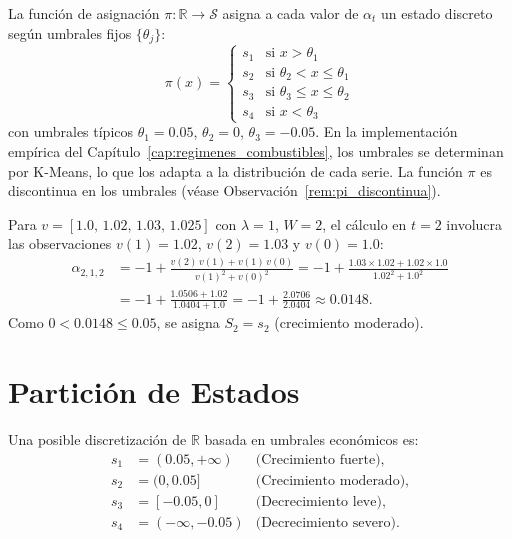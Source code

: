 \begin{definition}
\label{def:pi_cuantizacion}
La función de asignación $\pi\colon \mathbb{R} \to \mathcal{S}$
asigna a cada valor de $\alpha_t$ un estado discreto según
umbrales fijos $\{\theta_j\}$:
\[
\pi(x) = \begin{cases}
  s_1 & \text{si } x > \theta_1 \\
  s_2 & \text{si } \theta_2 < x \leq \theta_1 \\
  s_3 & \text{si } \theta_3 \leq x \leq \theta_2 \\
  s_4 & \text{si } x < \theta_3
\end{cases}
\]
con umbrales típicos $\theta_1 = 0.05$, $\theta_2 = 0$,
$\theta_3 = -0.05$.  En la implementación empírica del
Capítulo~\ref{cap:regimenes_combustibles}, los umbrales se
determinan por K-Means, lo que los adapta a la distribución de
cada serie.  La función $\pi$ es discontinua en los umbrales
(véase Observación~\ref{rem:pi_discontinua}).
\end{definition}

\begin{examplex}
Para $v = [1.0,\, 1.02,\, 1.03,\, 1.025]$ con $\lambda = 1$,
$W = 2$, el cálculo en $t = 2$ involucra las observaciones
$v(1) = 1.02$, $v(2) = 1.03$ y $v(0) = 1.0$:
\begin{align*}
\alpha_{2,1,2} &= -1 + \frac{v(2)\,v(1) + v(1)\,v(0)}
                           {v(1)^2 + v(0)^2}
  = -1 + \frac{1.03 \times 1.02 + 1.02 \times 1.0}
             {1.02^2 + 1.0^2} \\
  &= -1 + \frac{1.0506 + 1.02}{1.0404 + 1.0}
  = -1 + \frac{2.0706}{2.0404} \approx 0.0148.
\end{align*}
Como $0 < 0.0148 \leq 0.05$, se asigna $S_2 = s_2$
(crecimiento moderado).
\end{examplex}

\section{Partición de Estados}
\label{sec:markov_particion_estados}

Una posible discretización de \(\mathbb{R}\) basada en umbrales económicos es:
\begin{align*}
s_1 &= (0.05, +\infty) & \text{(Crecimiento fuerte)},\\
s_2 &= (0, 0.05] & \text{(Crecimiento moderado)},\\
s_3 &= [-0.05, 0] & \text{(Decrecimiento leve)},\\
s_4 &= (-\infty, -0.05) & \text{(Decrecimiento severo)}.
\end{align*}

